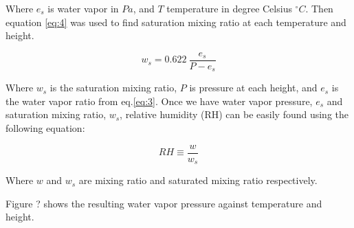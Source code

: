 \documentclass[a4paper,12pt]{article}
\numberwithin{equation}{section} %
\begin{document}
Where $e_s$ is water vapor in $Pa$, and $T$ temperature in degree Celsius $^\circ C$. Then equation \ref{eq:4} was used to find saturation mixing ratio at each temperature and height.

\vspace{0.25cm}
\begin{equation}\label{eq:4}
w_s = 0.622 \: \frac{e_s}{P - e_s}
\end{equation}
\vspace{0.25cm}

Where $w_s$ is the saturation mixing ratio, $P$ is pressure at each height, and $e_s$ is the water vapor ratio from eq.\ref{eq:3}. Once we have water vapor pressure, $e_s$ and saturation mixing ratio, $w_s$, relative humidity (RH) can be easily found using the following equation:

\vspace{0.25cm}
\begin{equation}
RH\equiv\frac{w}{w_s}
\end{equation}
\vspace{0.25cm}

Where $w$ and $w_s$ are mixing ratio and saturated mixing ratio respectively.

Figure ? shows the resulting water vapor pressure against temperature and height.





\end{document}
